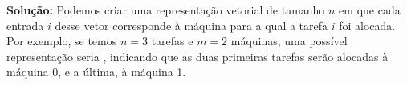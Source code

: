 \noindent \textbf{Solução:}
Podemos criar uma representação vetorial de tamanho $n$ em que cada entrada $i$ desse vetor corresponde à máquina para a qual a tarefa $i$ foi alocada. Por exemplo, se temos $n = 3$ tarefas e $m = 2$ máquinas, uma possível representação seria   , indicando que as duas primeiras tarefas serão alocadas à máquina 0, e a última, à máquina 1.

